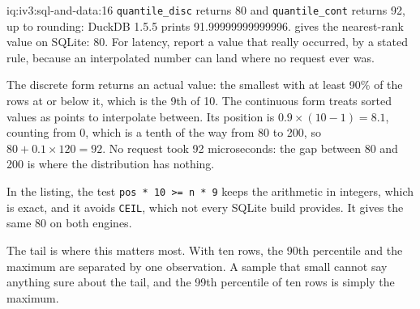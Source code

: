 \begin{solution}{iq:iv3:sql-and-data:16}
\texttt{quantile\_disc} returns 80 and \texttt{quantile\_cont} returns 92, up to rounding: DuckDB 1.5.5 prints 91.99999999999996.  gives the nearest-rank value on SQLite: 80. For latency, report a value that really occurred, by a stated rule, because an interpolated number can land where no request ever was.
\label{lst:iv3:sq:rank}

The discrete form returns an actual value: the smallest with at least 90\% of the rows at or below it, which is the 9th of 10. The continuous form treats sorted values as points to interpolate between. Its position is $0.9 \times (10 - 1) = 8.1$, counting from 0, which is a tenth of the way from 80 to 200, so $80 + 0.1 \times 120 = 92$. No request took 92 microseconds: the gap between 80 and 200 is where the distribution has nothing.

In the listing, the test \texttt{pos * 10 >= n * 9} keeps the arithmetic in integers, which is exact, and it avoids \texttt{CEIL}, which not every SQLite build provides. It gives the same 80 on both engines.

The tail is where this matters most. With ten rows, the 90th percentile and the maximum are separated by one observation. A sample that small cannot say anything sure about the tail, and the 99th percentile of ten rows is simply the maximum.

\end{solution}

